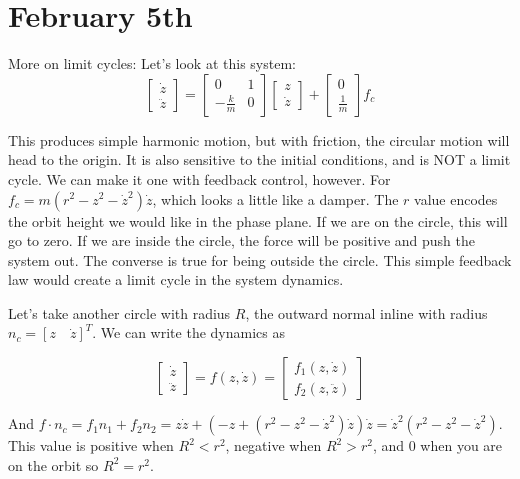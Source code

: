\documentclass[11pt]{article}
\begin{document}
\section*{February 5th}
More on limit cycles:
Let's look at this system:
\begin{equation}
\begin{bmatrix}
\dot{z} \\
\ddot{z}
\end{bmatrix}
=
\begin{bmatrix}
0 &1 \\
-\frac{k}{m} &0
\end{bmatrix}
\begin{bmatrix}
{z} \\
\dot{z}
\end{bmatrix}
+
\begin{bmatrix}
0 \\
\frac{1}{m}
\end{bmatrix}
f_c
\end{equation}

This produces simple harmonic motion, but with friction, the circular motion will head to the origin. It is also sensitive to the initial conditions, and is NOT a limit cycle. We can make it one with feedback control, however.
For $f_c = m(r^2 -z^2 - \dot{z}^2)\dot{z}$, which looks a little like a damper. The $r$ value encodes the orbit height we would like in the phase plane. If we are on the circle, this will go to zero. If we are inside the circle, the force will be positive and push the system out. The converse is true for being outside the circle. This simple feedback law would create a limit cycle in the system dynamics.

Let's take another circle with radius $R$, the outward normal inline with radius $n_c = [z \quad \dot{z}]^T$. We can write the dynamics as 


\begin{equation}
\begin{bmatrix}
\dot{z} \\
\ddot{z}
\end{bmatrix}
= f(z,\dot{z}) = 
\begin{bmatrix}
f_1(z,\dot{z}) \\
f_2(z,\ddot{z})
\end{bmatrix}
\end{equation}

And $f \cdot n_c = f_1n_1 + f_2n_2 = z\dot{z} + (-z+(r^2-z^2-\dot{z}^2)\dot{z})\dot{z} = \dot{z}^2(r^2 - z^2 -\dot{z}^2)$. This value is positive when $R^2 < r^2$, negative when $R^2 > r^2$, and 0 when you are on the orbit so $R^2 = r^2$.
\end{document}
